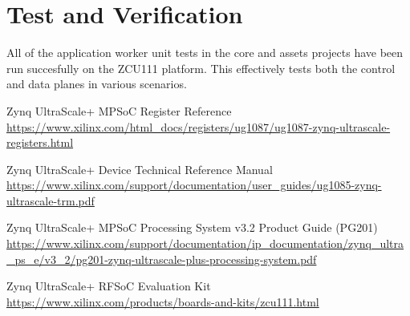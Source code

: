 \documentclass{article}
\begin{document}
\section{Test and Verification}
All of the application worker unit tests in the core and assets projects have been run succesfully on the ZCU111 platform. This effectively tests both the control and data planes in various scenarios.

\begin{thebibliography}{1}


   Zynq UltraScale+ MPSoC Register Reference \\
  \url{https://www.xilinx.com/html_docs/registers/ug1087/ug1087-zynq-ultrascale-registers.html}

   Zynq UltraScale+ Device Technical Reference Manual \\
  \url{https://www.xilinx.com/support/documentation/user_guides/ug1085-zynq-ultrascale-trm.pdf}

   Zynq UltraScale+ MPSoC Processing System v3.2 Product Guide (PG201) \\
  \url{https://www.xilinx.com/support/documentation/ip_documentation/zynq_ultra_ps_e/v3_2/pg201-zynq-ultrascale-plus-processing-system.pdf}

   Zynq UltraScale+ RFSoC Evaluation Kit \\
  \url{https://www.xilinx.com/products/boards-and-kits/zcu111.html}

\end{thebibliography}
\end{document}
